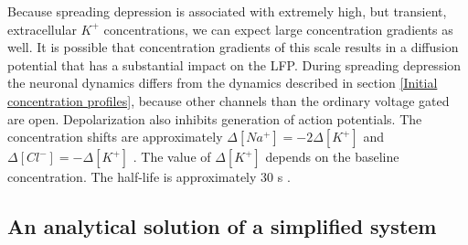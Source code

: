 \documentclass{article}
\begin{document}
Because spreading depression is associated with extremely high, but transient, extracellular $K^+$ concentrations, we can expect large concentration gradients as well. It is possible that concentration gradients of this scale results in a diffusion potential that has a substantial impact on the LFP. During spreading depression the neuronal dynamics differs from the dynamics described in section \ref{Initial concentration profiles}, because other channels than the ordinary voltage gated are open. Depolarization also inhibits generation of action potentials. The concentration shifts are approximately $\Delta [Na^+] = -2\Delta [K^+]$ and $\Delta [Cl^-] = -\Delta[K^+]$ \cite{Herreras1993} \cite{Ataya2015}. The value of $\Delta [K^+]$ depends on the baseline concentration. The half-life is approximately 30 s \cite{Ataya2015}.

\subsection{An analytical solution of a simplified system}
\end{document}
